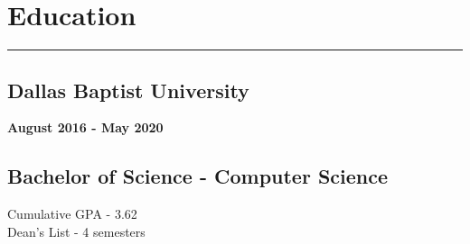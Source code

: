 \documentclass[10pt]{article}
\begin{document}
\section*{Education}
\vspace{-.6cm}
\par\noindent\textcolor{black}{\rule{\textwidth}{.5pt}} 
\vspace{-.8cm}
\begin{paracol}{2}
    \begin{leftcolumn} 
        \sloppy
        \subsection*{Dallas Baptist University}
        \textbf{August 2016 -  May 2020}
    \end{leftcolumn}

    \begin{rightcolumn} 
        \subsection*{Bachelor of Science - Computer Science}
        Cumulative GPA - 3.62 \\
        Dean's List - 4 semesters
    \end{rightcolumn}
\end{paracol}
\end{document}
